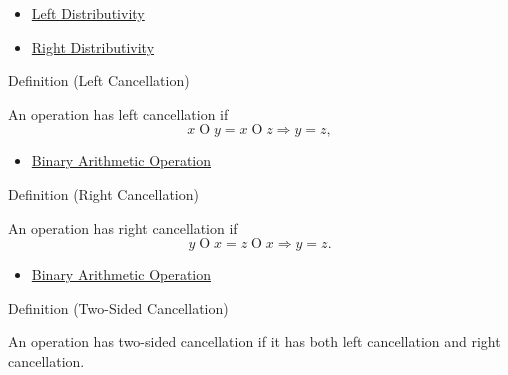 \begin{dependencies}
\begin{itemize}
  \item \hyperref[def:left-distributivity]{Left Distributivity}
  \item \hyperref[def:right-distributivity]{Right Distributivity}
\end{itemize}
\end{dependencies}

\begin{definitionbox}{Definition (Left Cancellation)}
\begin{definition}
\label{def:left-cancellation}
An operation has left cancellation if
\[
x\mathbin{O}y=x\mathbin{O}z \Longrightarrow y=z,
\]
\end{definition}
\end{definitionbox}

\begin{dependencies}
\begin{itemize}
  \item \hyperref[def:binary-arithmetic-operation]{Binary Arithmetic Operation}
\end{itemize}
\end{dependencies}

\begin{definitionbox}{Definition (Right Cancellation)}
\begin{definition}
\label{def:right-cancellation}
An operation has right cancellation if
\[
y\mathbin{O}x=z\mathbin{O}x \Longrightarrow y=z.
\]
\end{definition}
\end{definitionbox}

\begin{dependencies}
\begin{itemize}
  \item \hyperref[def:binary-arithmetic-operation]{Binary Arithmetic Operation}
\end{itemize}
\end{dependencies}

\begin{definitionbox}{Definition (Two-Sided Cancellation)}
\begin{definition}
\label{def:two-sided-cancellation}
An operation has two-sided cancellation if it has both left cancellation and
right cancellation.
\end{definition}
\end{definitionbox}

